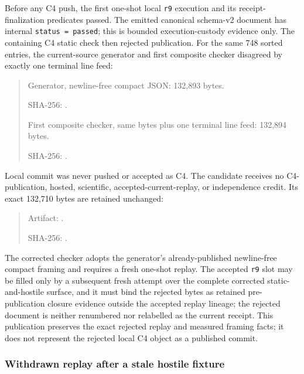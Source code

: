 \documentclass[11pt,a4paper]{article}
\begin{document}
Before any C4 push, the first one-shot local \texttt{r9} execution and its receipt-finalization
predicates passed. The emitted canonical schema-v2 document has internal
\texttt{status = passed}; this is bounded execution-custody evidence only. The containing C4 static
check then rejected publication. For the same 748 sorted entries, the current-source generator
and first composite checker disagreed by exactly one terminal line feed:

\begin{quote}
\small\raggedright
Generator, newline-free compact JSON: 132,893 bytes.\par
SHA-256: .\par
First composite checker, same bytes plus one terminal line feed: 132,894 bytes.\par
SHA-256: .
\end{quote}

Local commit  was never pushed or accepted
as C4. The candidate receives no C4-publication, hosted, scientific, accepted-current-replay, or
independence credit. Its exact 132,710 bytes are retained unchanged:

\begin{quote}
\small\raggedright
Artifact: .\par
SHA-256: .
\end{quote}

The corrected checker adopts the generator's already-published newline-free compact framing and
requires a fresh one-shot replay. The accepted \texttt{r9} slot may be filled only by a subsequent
fresh attempt over the complete corrected static-and-hostile surface, and it must bind the rejected
bytes as retained pre-publication closure evidence outside the accepted replay lineage; the
rejected document is neither renumbered nor relabelled as the current receipt. This publication
preserves the exact rejected replay and measured framing facts; it does not represent the rejected
local C4 object as a published commit.

\subsubsection{Withdrawn replay after a stale hostile fixture}
\end{document}
